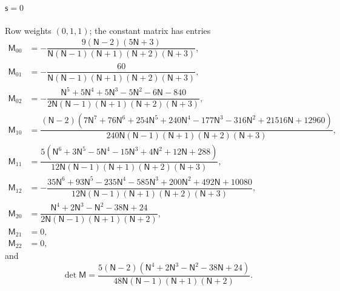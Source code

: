 \documentclass{amsart}
\theoremstyle{definition}
\theoremstyle{remark}
\numberwithin{equation}{section}
\begin{document}
\paragraph{$\mathsf s=0$} Row weights $(0,1,1)$; the constant matrix has entries
{\small\allowdisplaybreaks\begin{align*}
  \mathsf M_{00}&=-\dfrac{9(\mathsf N - 2)(5\mathsf N + 3)}{\mathsf N(\mathsf N - 1)(\mathsf N + 1)(\mathsf N + 2)(\mathsf N + 3)},\\
  \mathsf M_{01}&=-\dfrac{60}{\mathsf N(\mathsf N - 1)(\mathsf N + 1)(\mathsf N + 2)(\mathsf N + 3)},\\
  \mathsf M_{02}&=-\dfrac{\mathsf N^{5} + 5\mathsf N^{4} + 5\mathsf N^{3} - 5\mathsf N^{2} - 6\mathsf N - 840}{2\mathsf N(\mathsf N - 1)(\mathsf N + 1)(\mathsf N + 2)(\mathsf N + 3)},\\
  \mathsf M_{10}&=\dfrac{(\mathsf N - 2)(7\mathsf N^{7} + 76\mathsf N^{6} + 254\mathsf N^{5} + 240\mathsf N^{4} - 177\mathsf N^{3} - 316\mathsf N^{2} + 21516\mathsf N + 12960)}{240\mathsf N(\mathsf N - 1)(\mathsf N + 1)(\mathsf N + 2)(\mathsf N + 3)},\\
  \mathsf M_{11}&=\dfrac{5(\mathsf N^{6} + 3\mathsf N^{5} - 5\mathsf N^{4} - 15\mathsf N^{3} + 4\mathsf N^{2} + 12\mathsf N + 288)}{12\mathsf N(\mathsf N - 1)(\mathsf N + 1)(\mathsf N + 2)(\mathsf N + 3)},\\
  \mathsf M_{12}&=-\dfrac{35\mathsf N^{6} + 93\mathsf N^{5} - 235\mathsf N^{4} - 585\mathsf N^{3} + 200\mathsf N^{2} + 492\mathsf N + 10080}{12\mathsf N(\mathsf N - 1)(\mathsf N + 1)(\mathsf N + 2)(\mathsf N + 3)},\\
  \mathsf M_{20}&=\dfrac{\mathsf N^{4} + 2\mathsf N^{3} - \mathsf N^{2} - 38\mathsf N + 24}{2\mathsf N(\mathsf N - 1)(\mathsf N + 1)(\mathsf N + 2)},\\
  \mathsf M_{21}&=0,\\
  \mathsf M_{22}&=0,
\end{align*}}
and
\[\det\mathsf M=\frac{5(\mathsf N - 2)(\mathsf N^{4} + 2\mathsf N^{3} - \mathsf N^{2} - 38\mathsf N + 24)}{48\mathsf N(\mathsf N - 1)(\mathsf N + 1)(\mathsf N + 2)}.\]
\end{document}
